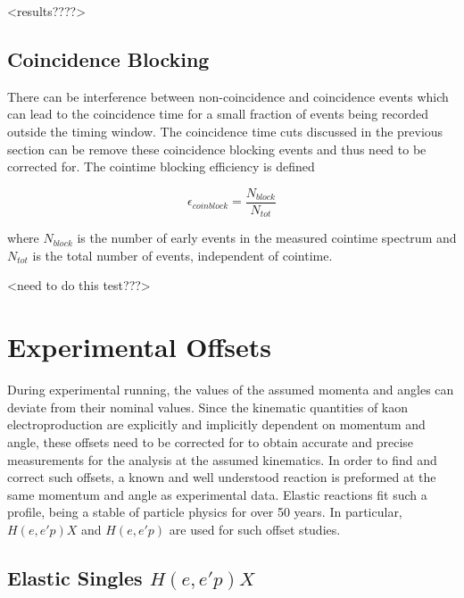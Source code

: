 \documentclass[
]{report}
\begin{document}
\textless results????\textgreater{}

\hypertarget{coincidence-blocking}{%
\subsection{Coincidence Blocking}\label{coincidence-blocking}}

There can be interference between non-coincidence and coincidence events
which can lead to the coincidence time for a small fraction of events
being recorded outside the timing window. The coincidence time cuts
discussed in the previous section can be remove these coincidence
blocking events and thus need to be corrected for. The cointime blocking
efficiency is defined

\begin{equation} 
  \epsilon_{coinblock}=\frac{N_{block}}{N_{tot}}
  \label{eq:coinblock} 
\end{equation}

\noindent where \(N_{block}\) is the number of early events in the
measured cointime spectrum and \(N_{tot}\) is the total number of
events, independent of cointime.

\textless need to do this test???\textgreater{}

\hypertarget{Section-5.5}{%
\section{Experimental Offsets}\label{Section-5.5}}

During experimental running, the values of the assumed momenta and
angles can deviate from their nominal values. Since the kinematic
quantities of kaon electroproduction are explicitly and implicitly
dependent on momentum and angle, these offsets need to be corrected for
to obtain accurate and precise measurements for the analysis at the
assumed kinematics. In order to find and correct such offsets, a known
and well understood reaction is preformed at the same momentum and angle
as experimental data. Elastic reactions fit such a profile, being a
stable of particle physics for over 50 years. In particular,
\(H(e,e'p)X\) and \(H(e, e'p)\) are used for such offset studies.

\hypertarget{elastic-singles-he-epx}{%
\subsection{\texorpdfstring{Elastic Singles
\(H(e, e'p)X\)}{Elastic Singles H(e, e\textquotesingle p)X}}\label{elastic-singles-he-epx}}
\end{document}
